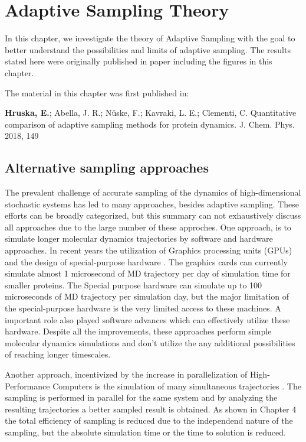 \afterpage{\null\newpage}
\chapter{Adaptive Sampling Theory\label{ch:chapter3}}


In this chapter, we investigate the theory of Adaptive Sampling with the goal to better understand the possibilities and limits of adaptive sampling. The results stated here were originally published in paper  including the figures in this chapter.

The material in this chapter was first published in: 

\cite{Adstrategies2018} \textbf{Hruska, E.}; Abella, J. R.; N\"uske, F.;
Kavraki, L. E.; Clementi, C. Quantitative
comparison of adaptive sampling methods
for protein dynamics. J. Chem. Phys.
2018, 149 




\section{\label{sec:intro2}Alternative sampling approaches}


The prevalent challenge of accurate sampling of the dynamics of high-dimensional stochastic systems  has led to many approaches, besides adaptive sampling.
These efforts can be broadly categorized, but this summary can not exhaustively discuss all approaches due to the large number of these approches.
One approach, is to simulate longer molecular dynamics trajectories by software and hardware approaches. In recent years the utilization of Graphics processing units (GPUs) and the design of special-purpose hardware \cite{shaw2014anton}. The graphics cards can currently simulate almost 1 microsecond of MD trajectory per day of simulation time for smaller proteins. The Special purpose hardware can simulate up to 100 microseconds of MD trajectory per simulation day, but the major limitation of the special-purpose hardware is the very limited access to these machines. A important role also played software advances which can effectively utilize these hardware. Despite all the improvements, these approaches perform simple molecular dynamics simulations and don't utilize the any additional possibilities of reaching longer timescales.

Another approach, incentivized by the increase in parallelization of High-Performance Computers is the simulation of many simultaneous trajectories \cite{DistComp-Shirts2000, DistComp-Buch2010}. The sampling is performed in parallel for the same system and by analyzing the resulting trajectories a better sampled result is obtained.  As shown in Chapter 4 the total efficiency of sampling is reduced due to the independend nature of the sampling, but the absolute simulation time or the time to solution is reduced.

